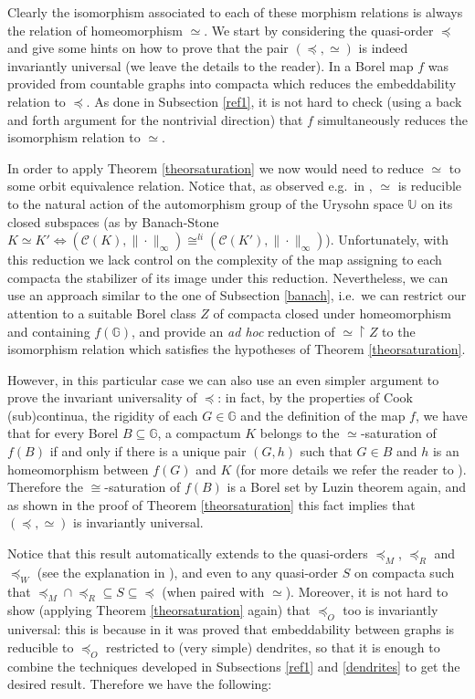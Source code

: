 \documentclass{amsart}
\theoremstyle{definition}
\theoremstyle{remark}
\begin{document}
Clearly the isomorphism associated to each of these morphism relations is always the relation of homeomorphism $\simeq$. We start by considering the quasi-order $\preceq$ and give some hints on how to prove that the pair $(\preceq, \simeq)$ is indeed invariantly universal (we leave the details to the reader). In \cite[Theorem 3]{Camerlo2005} a Borel map $f$ was provided from countable graphs into compacta which reduces the embeddability relation to $\preceq$. As done in Subsection \ref{ref1}, it is not hard to check (using a back and forth argument for the nontrivial direction) that $f$ simultaneously reduces the isomorphism relation to $\simeq$.

In order to apply Theorem \ref{theorsaturation} we now would need to reduce
$\simeq$ to some orbit equivalence relation. Notice that, as observed
e.g.\ in \cite[Section 4.2]{louros}, $\simeq$ is reducible to the
natural action of the automorphism group of the Urysohn space
$\mathbb{U}$ on its closed subspaces (as by Banach-Stone $K \simeq K'
\iff (\mathcal{C}(K), \| \cdot \|_\infty) \cong^{li}
(\mathcal{C}(K'),\| \cdot \|_\infty)$). Unfortunately, with this reduction we lack control on the
complexity of the map assigning to each compacta the stabilizer of its
image under this reduction. Nevertheless, we can use an approach similar to
the one of Subsection \ref{banach}, i.e.\ we can restrict our attention to a
suitable Borel class $Z$ of compacta closed under homeomorphism and
containing $f({\mathbb{G}})$, and provide an \emph{ad hoc} reduction of ${\simeq}
\restriction Z$ to the isomorphism relation which satisfies the hypotheses of Theorem \ref{theorsaturation}.

However, in this particular case we can also use an even simpler argument to prove the invariant universality of $\preceq$: in fact, by the properties of Cook (sub)continua, the rigidity of each $G \in {\mathbb{G}}$ and the definition of the map $f$, we have that for every Borel $B \subseteq {\mathbb{G}}$, a compactum $K$ belongs to the $\simeq$-saturation of $f(B)$ if and only if there is a unique pair $(G,h)$ such that $G \in B$ and $h$ is an homeomorphism between $f(G)$ and $K$ (for more details we refer the reader to \cite{Camerlo2005}). Therefore the $\cong$-saturation of $f(B)$ is a Borel set by Luzin theorem \cite[Theorem 18.11]{Kechris1995} again, and as shown in the proof of Theorem \ref{theorsaturation} this fact implies that $(\preceq, \simeq)$ is invariantly universal.

Notice that this result automatically extends to the quasi-orders $\preceq_M$, $\preceq_R$ and $\preceq_W$ (see the explanation in \cite[p.\ 203]{Camerlo2005}), and even to any quasi-order $S$ on compacta such that ${{\preceq_M} \cap {\preceq_R}} \subseteq S \subseteq {\preceq}$ (when paired with $\simeq$). Moreover, it is not hard to show (applying Theorem \ref{theorsaturation} again) that $\preceq_O$ too is invariantly universal: this is because in \cite{Camerlo2005} it was proved that embeddability between graphs is reducible to $\preceq_O$ restricted to (very simple) dendrites, so that it is enough to combine the techniques developed in Subsections \ref{ref1} and \ref{dendrites} to get the desired result. Therefore we have the following:
\end{document}
